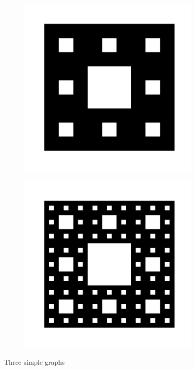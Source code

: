 \begin{figure}[h!]
\begin{subfigure}[b!]{0.27 \textwidth}
     \end{subfigure}\hspace*{-0.9em}
     \begin{subfigure}[b!]{0.27 \textwidth}
         \caption{}
         \includegraphics[width=\textwidth]{Imagenes/Fractal/sierpinski_carpet_3.pdf}
     \end{subfigure}\hspace*{-0.9em}
     \begin{subfigure}[b!]{0.27 \textwidth}
         \caption{}
         \includegraphics[width=\textwidth]{Imagenes/Fractal/sierpinski_carpet_4.pdf}
     \end{subfigure}
        \caption{Three simple graphs}
        \label{fig:Fractals}
\end{figure}

